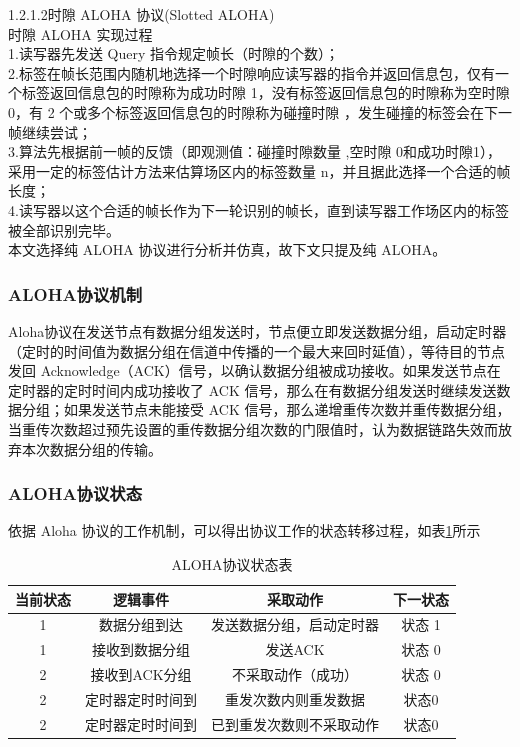 \documentclass{article}
\begin{document}
	\par
	1.2.1.2时隙 ALOHA 协议(Slotted ALOHA)\\
	时隙 ALOHA 实现过程\\
	1.读写器先发送 Query 指令规定帧长（时隙的个数）；\\
	2.标签在帧长范围内随机地选择一个时隙响应读写器的指令并返回信息包，仅有一个标签返回信息包的时隙称为成功时隙 1，没有标签返回信息包的时隙称为空时隙 0，有 2 个或多个标签返回信息包的时隙称为碰撞时隙 ，发生碰撞的标签会在下一帧继续尝试；\\
	3.算法先根据前一帧的反馈（即观测值：碰撞时隙数量 ,空时隙 0和成功时隙1），采用一定的标签估计方法来估算场区内的标签数量 n，并且据此选择一个合适的帧长度；\\
	4.读写器以这个合适的帧长作为下一轮识别的帧长，直到读写器工作场区内的标签被全部识别完毕。\\
	本文选择纯 ALOHA 协议进行分析并仿真，故下文只提及纯 ALOHA。
	
	
	\subsubsection{ALOHA协议机制}
	Aloha协议在发送节点有数据分组发送时，节点便立即发送数据分组，启动定时器（定时的时间值为数据分组在信道中传播的一个最大来回时延值），等待目的节点发回 Acknowledge（ACK）信号，以确认数据分组被成功接收。如果发送节点在定时器的定时时间内成功接收了 ACK 信号，那么在有数据分组发送时继续发送数据分组；如果发送节点未能接受 ACK 信号，那么递增重传次数并重传数据分组，当重传次数超过预先设置的重传数据分组次数的门限值时，认为数据链路失效而放弃本次数据分组的传输。
	\subsubsection{ALOHA协议状态}
	依据 Aloha 协议的工作机制，可以得出协议工作的状态转移过程，如表\ref{table-1}所示
	\begin{table}[htbp]
		\centering
		\caption{ALOHA协议状态表}
		\label{table-1}
		\begin{tabular}{|c| c| c| c|}
			\hline
			当前状态 & 逻辑事件 & 采取动作 & 下一状态\\
			\hline
			 1& 数据分组到达 & 发送数据分组，启动定时器 & 状态 1\\
			\hline 
			1 & 接收到数据分组 & 发送ACK  & 状态 0\\
			\hline
			2 & 接收到ACK分组 & 不采取动作（成功） & 状态 0 \\
			\hline
			2 & 定时器定时时间到 & 重发次数内则重发数据 & 状态0 \\
			\hline
			2 & 定时器定时时间到 & 已到重发次数则不采取动作 & 状态0 \\
			\hline
		\end{tabular}
	\end{table}
\end{document}
